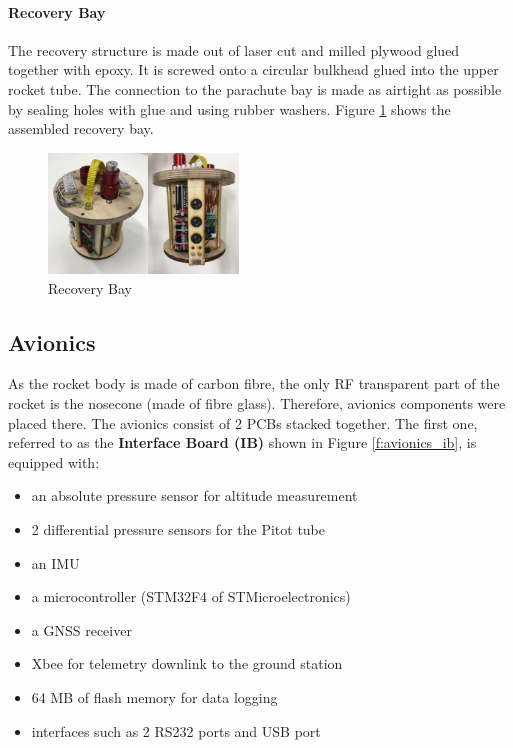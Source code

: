 \paragraph{Recovery Bay}
 The recovery structure is made out of laser cut and milled plywood glued together with epoxy. It is screwed onto a circular bulkhead glued into the upper rocket tube. The connection to the parachute bay is made as airtight as possible by sealing holes with glue and using rubber washers.
Figure \ref{f:recovery_bay} shows the assembled recovery bay.
 \begin{figure}[h!]
 	\centering
        \includegraphics[width=0.45\textwidth]{img/recovery_bay.jpg}
        \caption{Recovery Bay}
        \label{f:recovery_bay}
 \end{figure}


\subsection{Avionics}
As the rocket body is made of carbon fibre, the only RF transparent part of the rocket is the nosecone (made of fibre glass). Therefore, avionics components were placed there. The avionics consist of 2 PCBs stacked together. The first one, referred to as the \textbf{Interface Board (IB)} shown in Figure \ref{f:avionics_ib}, is equipped with:
\begin{itemize}[noitemsep]
    \item an absolute pressure sensor for altitude measurement
    \item 2 differential pressure sensors for the Pitot tube
    \item an IMU
    \item a microcontroller (STM32F4 of STMicroelectronics)
    \item a GNSS receiver
    \item Xbee for telemetry downlink to the ground station
    \item 64 MB of flash memory for data logging
    \item interfaces such as 2 RS232 ports and USB port
\end{itemize}

